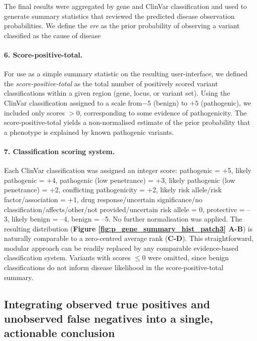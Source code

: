 The final results were aggregated by gene and ClinVar classification and used to generate summary statistics that reviewed the predicted disease observation probabilities.
We define the \emph{\ac{vre}} as the prior probability of observing a variant classified as the cause of disease 

\paragraph{6. Score-positive-total.}
For use as a simple summary statistic on the resulting user-interface, we defined the \emph{score-positive-total} as the total number of positively scored variant classifications within a given region (gene, locus, or variant set). 
Using the ClinVar classification assigned to a scale from$-5$ (benign) to $+5$ (pathogenic), we included only scores $> 0$, corresponding to some evidence of pathogenicity. 
The score-positive-total yields a non-normalised estimate of the prior probability that a phenotype is explained by known pathogenic variants.

\paragraph{7. Classification scoring system.}
\label{sec:classification_score}
Each ClinVar classification was assigned an integer score: pathogenic = +5, likely pathogenic = +4, pathogenic (low penetrance) = +3, likely pathogenic (low penetrance) = +2, conflicting pathogenicity = +2, likely risk allele/risk factor/association = +1, drug response/uncertain significance/no classification/affects/other/not provided/uncertain risk allele = 0, protective = –3, likely benign = –4, benign = –5. No further normalisation was applied. The resulting distribution (\textbf{Figure \ref{fig:p_gene_summary_hist_patch3} A-B}) is naturally comparable to a zero-centred average rank (\textbf{C-D}). This straightforward, modular approach can be readily replaced by any comparable evidence-based classification system. Variants with scores  $\leq 0$ were omitted, since benign classifications do not inform disease likelihood in the score-positive-total summary.

\subsection{Integrating observed true positives and unobserved false negatives into a single, actionable conclusion}

